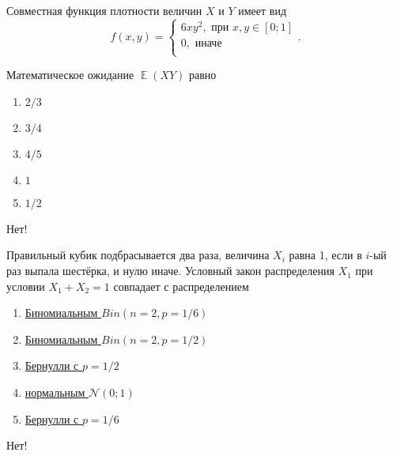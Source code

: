 \documentclass[t]{beamer}
\DeclareMathOperator{\E}{\mathbb{E}}
\newcommand{\cN}{\mathcal{N}}
\begin{document}
 \begin{frame} \label{39-No} 
\begin{block}{39} 

Совместная функция плотности величин $X$ и $Y$ имеет вид
\[
f(x,y) =
\begin{cases}
6xy^2, \text{ при } x, y \in [0;1] \\
0, \text{ иначе } \\
\end{cases}.
\]

Математическое ожидание $\E(XY)$ равно
  


 \end{block} 
\begin{enumerate} 
\item[] \hyperlink{39-No}{\beamergotobutton{}   $2/3$ }
\item[] \hyperlink{39-No}{\beamergotobutton{}  $3/4$ }
\item[] \hyperlink{39-No}{\beamergotobutton{}  $4/5$ }
\item[] \hyperlink{39-No}{\beamergotobutton{}  $1$ }
\item[] \hyperlink{39-Yes}{\beamergotobutton{}  $1/2$ }
\end{enumerate} 

 \alert{Нет!} 
\end{frame} 


 \begin{frame} \label{40-No} 
\begin{block}{40} 

Правильный кубик подбрасывается два раза, величина $X_i$ равна 1, если в $i$-ый раз выпала шестёрка, и нулю иначе. Условный закон распределения $X_1$ при условии $X_1+X_2=1$ совпадает с распределением


 \end{block} 
\begin{enumerate} 
\item[] \hyperlink{40-No}{\beamergotobutton{}  Биномиальным $Bin(n=2, p=1/6)$ }
\item[] \hyperlink{40-No}{\beamergotobutton{}  Биномиальным $Bin(n=2, p=1/2)$ }
\item[] \hyperlink{40-Yes}{\beamergotobutton{}  Бернулли с $p=1/2$ }
\item[] \hyperlink{40-No}{\beamergotobutton{}  нормальным $\cN(0;1)$ }
\item[] \hyperlink{40-No}{\beamergotobutton{}  Бернулли с $p=1/6$ }
\end{enumerate} 

 \alert{Нет!} 
\end{frame} 
\end{document}
